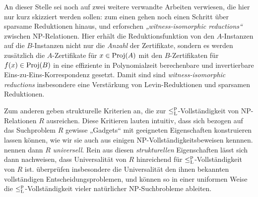 An dieser Stelle sei noch auf zwei weitere verwandte Arbeiten verwiesen, die hier nur kurz skizziert werden sollen: zum einen gehen \textcite{wiedermann_witness-isomorphic_1995} noch einen Schritt über sparsame Reduktionen hinaus, und erforschen \emph{„witness-isomorphic reductions“} zwischen NP-Relationen. Hier erhält die Reduktionsfunktion von den $A$-Instanzen auf die $B$-Instanzen nicht nur die \emph{Anzahl} der Zertifikate, sondern es werden zusätzlich die $A$-Zertifikate für $x\in\operatorname{Proj}(A)$ mit den $B$-Zertifikaten für $f(x)\in \operatorname{Proj}(B)$ in eine effiziente in Polynomialzeit berechenbare und invertierbare Eins-zu-Eins-Korrespondenz gesetzt. Damit sind sind \emph{witness-isomorphic reductions} insbesondere eine Verstärkung von Levin-Reduktionen und sparsamen Reduktionen.

Zum anderen geben \textcite{agrawal_universal_1992} strukturelle Kriterien an, die zur $\leq_\mathrm{L}^\mathrm{p}$-Vollständigkeit von NP-Relationen $R$ ausreichen. Diese Kritieren lauten intuitiv, dass sich bezogen auf das Suchproblem $R$ gewisse „Gadgets“ mit geeigneten Eigenschaften konstruieren lassen können, wie wir sie auch aus einigen NP-Vollständigkeitsbeweisen kennnen. \citeauthor{agrawal_universal_1992} nennen dann $R$ \emph{universell}. 
Rein aus diesen \emph{strukturellen} Eigenschaften lässt sich dann nachweisen, dass Universalität von $R$ hinreichend für $\leq_\mathrm{L}^\mathrm{p}$-Vollständigkeit von $R$ ist. 
\textcite{agrawal_universal_1992} überprüfen insbesondere die Universalität den ihnen bekannten vollständigen Entscheidungsproblemen, und können so in einer uniformen Weise die $\leq_\mathrm{L}^\mathrm{p}$-Vollständigkeit vieler natürlicher NP-Suchbrobleme ableiten.

